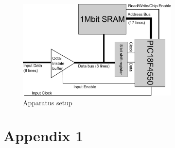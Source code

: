 \documentclass[11pt]{article}
\begin{document}
    \begin{figure}
    \centering
    \includegraphics[height=5cm]{block_diagram.pdf}
    \caption{Apparatus setup}
    \label{fig:app}
    \end{figure}
	
\appendix
\appendixpage
\addappheadtotoc
\section{Appendix 1}
			
\end{document}
